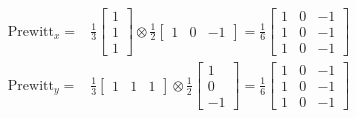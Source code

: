 \documentclass[a4paper,11pt]{article}
\begin{document}
\begin{align*}
    \text{Prewitt}_x =& \frac{1}{3} 
    \begin{bmatrix}
        1 \\
        1 \\
        1
    \end{bmatrix}
    \otimes
    \frac{1}{2}
    \begin{bmatrix}
        1 & 0 & -1
    \end{bmatrix}
    =
    \frac{1}{6}
    \begin{bmatrix}
        1 & 0 & -1 \\
        1 & 0 & -1 \\
        1 & 0 & -1
    \end{bmatrix} \\
    \text{Prewitt}_y =& \frac{1}{3} 
    \begin{bmatrix}
        1 & 1 & 1
    \end{bmatrix}
    \otimes
    \frac{1}{2}
    \begin{bmatrix}
        1 \\
        0 \\
        -1
    \end{bmatrix}
    =
    \frac{1}{6}
    \begin{bmatrix}
        1 & 0 & -1 \\
        1 & 0 & -1 \\
        1 & 0 & -1
    \end{bmatrix}
\end{align*}
\end{document}
